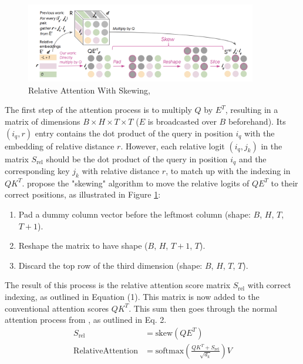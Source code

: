 \documentclass[a4paper,12pt]{extarticle}
\begin{document}
\begin{figure}[H] %
    \centering
    \includegraphics[width=0.9\textwidth]{relative_attn_skewing.png} %
    \caption{Relative Attention With Skewing, \textcite{DBLP:journals/corr/abs-1809-04281}}
    \label{fig:relatt}
\end{figure}
\vspace{0.1cm}
The first step of the attention process is to multiply $Q$ by $E^T$, resulting in a matrix of dimensions $B \times H \times T \times T$ ($E$ is broadcasted over $B$ beforehand). Its $(i_q, r)$ entry contains the dot product of the query in position $i_q$ with the embedding of relative distance $r$. However, each relative logit $(i_q, j_k)$ in the matrix $S_\text{rel}$  should be the dot product of the query in position $i_q$ and the corresponding key $j_k$ with relative distance $r$, to match up with the indexing in $QK^T$.
\textcite{DBLP:journals/corr/abs-1809-04281} propose the "skewing" algorithm to move the relative logits of $QE^T$ to their correct positions, as illustrated in Figure \ref{fig:relatt}:

\begin{enumerate}
\item Pad a dummy column vector before the leftmost column (shape: $B$, $H$, $T$, $T + 1$).
\item Reshape the matrix to have shape ($B$, $H$, $T + 1$, $T$).
\item Discard the top row of the third dimension (shape: $B$, $H$, $T$, $T$).
\end{enumerate}

The result of this process is the relative attention score matrix $S_\text{rel}$ with correct indexing, as outlined in Equation (1). This matrix is now added to the conventional attention scores $QK^T$. This sum then goes through the normal attention process from \textcite{DBLP:journals/corr/VaswaniSPUJGKP17}, as outlined in Eq. 2.\vspace{0.15cm}
\begin{align}
S_{\text{rel}} &= \text{skew}(QE^T) \\[0.2cm] 
\text{RelativeAttention} &=
\text{softmax}\left(\frac{QK^T+S_\text{rel}}{\sqrt{d_k}}\right)V
\end{align}
\end{document}
